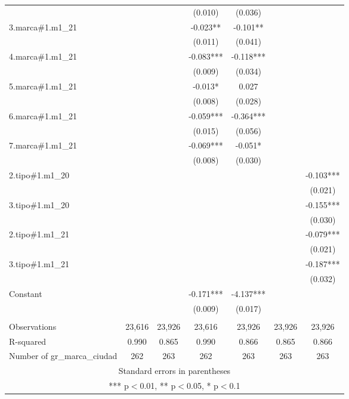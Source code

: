 \begin{longtable}{lcccccc}
 &  &  & (0.010) & (0.036) &  &  \\
3.marca\#1.m1\_21 &  &  & -0.023** & -0.101** &  &  \\
 &  &  & (0.011) & (0.041) &  &  \\
4.marca\#1.m1\_21 &  &  & -0.083*** & -0.118*** &  &  \\
 &  &  & (0.009) & (0.034) &  &  \\
5.marca\#1.m1\_21 &  &  & -0.013* & 0.027 &  &  \\
 &  &  & (0.008) & (0.028) &  &  \\
6.marca\#1.m1\_21 &  &  & -0.059*** & -0.364*** &  &  \\
 &  &  & (0.015) & (0.056) &  &  \\
7.marca\#1.m1\_21 &  &  & -0.069*** & -0.051* &  &  \\
 &  &  & (0.008) & (0.030) &  &  \\
2.tipo\#1.m1\_20 &  &  &  &  &  & -0.103*** \\
 &  &  &  &  &  & (0.021) \\
3.tipo\#1.m1\_20 &  &  &  &  &  & -0.155*** \\
 &  &  &  &  &  & (0.030) \\
2.tipo\#1.m1\_21 &  &  &  &  &  & -0.079*** \\
 &  &  &  &  &  & (0.021) \\
3.tipo\#1.m1\_21 &  &  &  &  &  & -0.187*** \\
 &  &  &  &  &  & (0.032) \\
Constant &  &  & -0.171*** & -4.137*** &  &  \\
 &  &  & (0.009) & (0.017) &  &  \\
 &  &  &  &  &  &  \\
Observations & 23,616 & 23,926 & 23,616 & 23,926 & 23,926 & 23,926 \\
R-squared & 0.990 & 0.865 & 0.990 & 0.866 & 0.865 & 0.866 \\
 Number of gr\_marca\_ciudad & 262 & 263 & 262 & 263 & 263 & 263 \\ \hline
\multicolumn{7}{c}{ Standard errors in parentheses} \\
\multicolumn{7}{c}{ *** p$<$0.01, ** p$<$0.05, * p$<$0.1} \\
\end{longtable}
